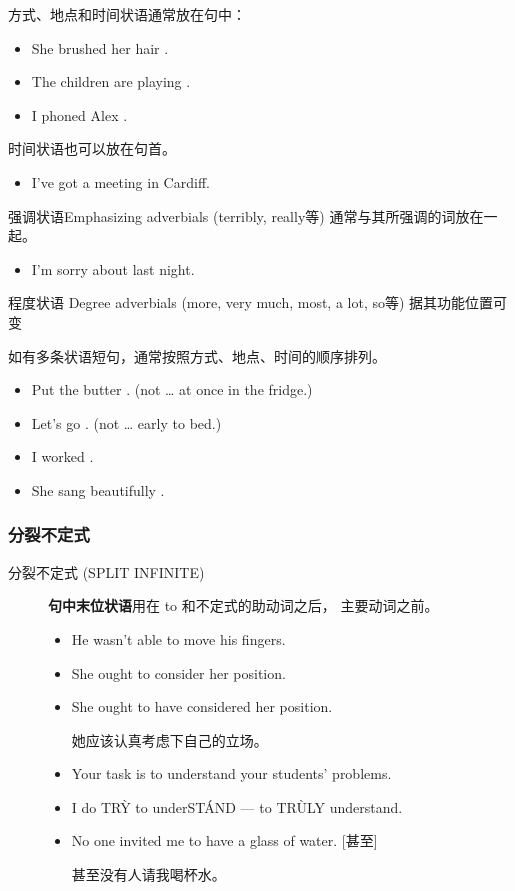 方式、地点和时间状语通常放在句中：
\begin{itemize}
\item She brushed her hair .
\item The children are playing .
\item I phoned Alex .
\end{itemize}

时间状语也可以放在句首。
\begin{itemize}
\item {} I've got a meeting in Cardiff.
\end{itemize}

强调状语Emphasizing adverbials (terribly, really等) 通常与其所强调的词放在一
起。
\begin{itemize}
\item I'm  sorry about last night.
\end{itemize}

程度状语 Degree adverbials (more, very much, most, a lot, so等) 据其功能位置可变

如有多条状语短句，通常按照方式、地点、时间的顺序排列。
\begin{itemize}
\item Put the butter  . (not … at once in the fridge.)
\item Let's go  . (not … early to bed.)
\item I worked  .
\item She sang beautifully  .
\end{itemize}

\subsubsection{分裂不定式}
\label{subsubsec:splitinf}

\begin{description}
\item[分裂不定式 (SPLIT INFINITE)]  \textbf{句中末位状语}用在 to 和不定式的助动词之后，
  主要动词之前。
  \begin{itemize}
  \item He wasn't able to  move his fingers.
  \item She ought to  consider her position.
  \item She ought to have  considered her position.

    她应该认真考虑下自己的立场。

  \item Your task is to  understand your students' problems.
  \item I do TR\`Y to underST\'AND --- to TR\`ULY understand.

  \item No one invited me to  have a glass of water. [甚至]

    甚至没有人请我喝杯水。
  \end{itemize}
\end{description}

